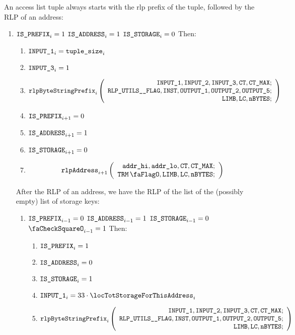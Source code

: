 An access list tuple always starts with the rlp prefix of the tuple, followed by the RLP of an address:
\begin{enumerate}[resume]
	\item \If $\texttt{IS\_PREFIX}_{i} = 1$ \et $\texttt{IS\_ADDRESS}_{i} = 1$ \et $\texttt{IS\_STORAGE}_{i} = 0$ Then:
		\begin{enumerate}
			\item $\texttt{INPUT\_1}_{i} = \texttt{tuple\_size}_{i}$
			\item $\texttt{INPUT\_3}_{i} = 1$ 
			\item 
				\[
    			\texttt{rlpByteStringPrefix}_{i}
    			\left(
				\begin{array}{r}
    			\texttt{INPUT\_1},
    			\texttt{INPUT\_2},
    			\texttt{INPUT\_3},
    			\texttt{CT},
    			\texttt{CT\_MAX}; \\
    			\texttt{RLP\_UTILS\_\_FLAG},
    			\texttt{INST},
    			\texttt{OUTPUT\_1},
    			\texttt{OUTPUT\_2},
    			\texttt{OUTPUT\_5}; \\
    			\texttt{LIMB},
    			\texttt{LC},
    			\texttt{nBYTES}; \\
    			\end{array}
				\right)
				\]
			\item $\texttt{IS\_PREFIX} _{i+1} = 0$
			\item $\texttt{IS\_ADDRESS}   _{i+1} = 1$
			\item $\texttt{IS\_STORAGE}    _{i+1} = 0$	
			\item 
				\[
    			\rlpAddress_{i+1}
    			\left(
    			\begin{array}{r}
    			\locAddressHi,
    			\locAddressLo,
    			\ct,
    			\maxCt; \\
    			\trmFlag,
    			\limb,
    			\lc,
    			\limbsize; \\
    			\end{array}
    			\right)
				\]
\end{enumerate}

After the RLP of an address, we have the RLP of the list of the (possibly empty) list of storage keys: 
\begin{enumerate}[resume]
	\item \If $\texttt{IS\_PREFIX}_{i-1} = 0$ \et $\texttt{IS\_ADDRESS}_{i-1} = 1$ \et $\texttt{IS\_STORAGE}_{i-1} = 0$ \et $\done_{i-1} =1$ Then:
		\begin{enumerate}
			\item $\texttt{IS\_PREFIX} _{i} = 1$
			\item $\texttt{IS\_ADDRESS}   _{i} = 0$
			\item $\texttt{IS\_STORAGE}    _{i} = 1$
			\item $\inputColumn{1}_{i} = 33 \cdot \locTotStorageForThisAddress_{i}$
			\item 
			\[
    		\texttt{rlpByteStringPrefix}_{i}
    		\left(
			\begin{array}{r}
    		\texttt{INPUT\_1},
    		\texttt{INPUT\_2},
    		\texttt{INPUT\_3},
    		\texttt{CT},
    		\texttt{CT\_MAX}; \\
    		\texttt{RLP\_UTILS\_\_FLAG},
    		\texttt{INST},
    		\texttt{OUTPUT\_1},
    		\texttt{OUTPUT\_2},
    		\texttt{OUTPUT\_5}; \\
    		\texttt{LIMB},
    		\texttt{LC},
    		\texttt{nBYTES}; \\
    		\end{array}
			\right)
			\]


\end{enumerate}
\end{enumerate}
\end{enumerate}
